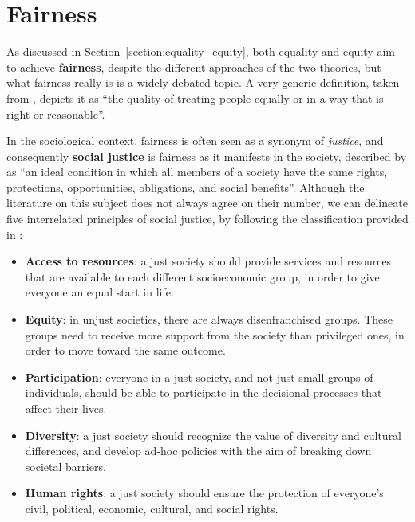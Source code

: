 \section{Fairness}
As discussed in Section~\ref{section:equality_equity}, both equality and equity aim to achieve \textbf{fairness}, despite the different approaches of the two theories, but what fairness really is is a widely debated topic. A very generic definition, taken from \cite{cambridge2013fairness}, depicts it as ``the quality of treating people equally or in a way that is right or reasonable''.

In the sociological context, fairness is often seen as a synonym of \textit{justice}, and consequently \textbf{social justice} is fairness as it manifests in the society, described by \cite[p.~405]{barker2003social} as ``an ideal condition in which all members of a society have the same rights, protections, opportunities, obligations, and social benefits''. Although the literature on this subject does not always agree on their number, we can delineate five interrelated principles of social justice, by following the classification provided in \cite{corporate2020social}:
\begin{itemize}
\item \textbf{Access to resources}: a just society should provide services and resources that are available to each different socioeconomic group, in order to give everyone an equal start in life.
\item \textbf{Equity}: in unjust societies, there are always disenfranchised groups. These groups need to receive more support from the society than privileged ones, in order to move toward the same outcome.
\item \textbf{Participation}: everyone in a just society, and not just small groups of individuals, should be able to participate in the decisional processes that affect their lives.
\item \textbf{Diversity}: a just society should recognize the value of diversity and cultural differences, and develop ad-hoc policies with the aim of breaking down societal barriers.
\item \textbf{Human rights}: a just society should ensure the protection of everyone's civil, political, economic, cultural, and social rights.
\end{itemize}

